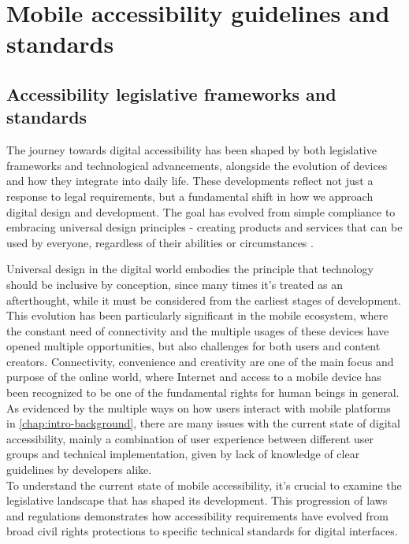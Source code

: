 \chapter{Mobile accessibility guidelines and standards}
\label{chap:accessibility}

\section{Accessibility legislative frameworks and standards}
\label{chap:accessibility-history-rules}

The journey towards digital accessibility has been shaped by both legislative frameworks and technological advancements, alongside the evolution of devices and how they integrate into daily life. These developments reflect not just a response to legal requirements, but a fundamental shift in how we approach digital design and development. The goal has evolved from simple compliance to embracing universal design principles - creating products and services that can be used by everyone, regardless of their abilities or circumstances \cite{article:universal-design}.

Universal design in the digital world embodies the principle that technology should be inclusive by conception, since many times it's treated as an afterthought, while it must be considered from the earliest stages of development. This evolution has been particularly significant in the mobile ecosystem, where the constant need of connectivity and the multiple usages of these devices have opened multiple opportunities, but also challenges for both users and content creators. Connectivity, convenience and creativity are one of the main focus and purpose of the online world, where Internet and access to a mobile device has been recognized to be one of the fundamental rights for human beings in general. \cite{article:right-to-internet}
As evidenced by the multiple ways on how users interact with mobile platforms in \ref{chap:intro-background}, there are many issues with the current state of digital accessibility, mainly a combination of user experience between different user groups and technical implementation, given by lack of knowledge of clear guidelines by developers alike. \\

To understand the current state of mobile accessibility, it's crucial to examine the legislative landscape that has shaped its development. This progression of laws and regulations demonstrates how accessibility requirements have evolved from broad civil rights protections to specific technical standards for digital interfaces.

